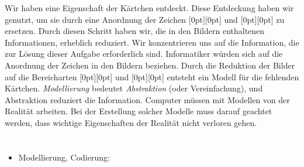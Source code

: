 {{Wir haben eine Eigenschaft der Kärtchen entdeckt. Diese Entdeckung haben wir genutzt, um sie durch eine Anordnung der Zeichen \raisebox{-0.5ex}[0pt][0pt]{} und \raisebox{-0.5ex}[0pt][0pt]{} zu ersetzen. Durch diesen Schritt haben wir, die in den Bildern enthaltenen Informationen, erheblich reduziert. Wir konzentrieren uns auf die Information, die zur Lösung dieser Aufgabe erforderlich sind. Informatiker würden sich auf die Anordnung der Zeichen in den Bildern beziehen. Durch die Reduktion der Bilder auf die Bereicharten \raisebox{-0.5ex}[0pt][0pt]{} und \raisebox{-0.5ex}[0pt][0pt]{} entsteht ein Modell für die fehlenden Kärtchen. \emph{Modellierung} bedeutet \emph{Abstraktion} (oder Vereinfachung), und Abstraktion reduziert die Information. Computer müssen mit Modellen von der Realität arbeiten. Bei der Erstellung solcher Modelle muss darauf geachtet werden, dass wichtige Eigenschaften der Realität nicht verloren gehen.



\section*{\BrochureWebsitesAndKeywords}
{\raggedright
\begin{itemize}
  \item Modellierung, Codierung: \href{https://de.wikipedia.org/wiki/Datenmodellierung}{}
\end{itemize}


}

}{}

\def\AuthorPohlW{} %
\def\AuthorCerarS{} %
\def\AuthorHieblerJ{} %
\def\AuthorFutschekG{} %
\def\AuthorCollierG{} %
\def\AuthorWillekesK{} %
\def\AuthorDatzkoThutS{} %

\newpage}{}
